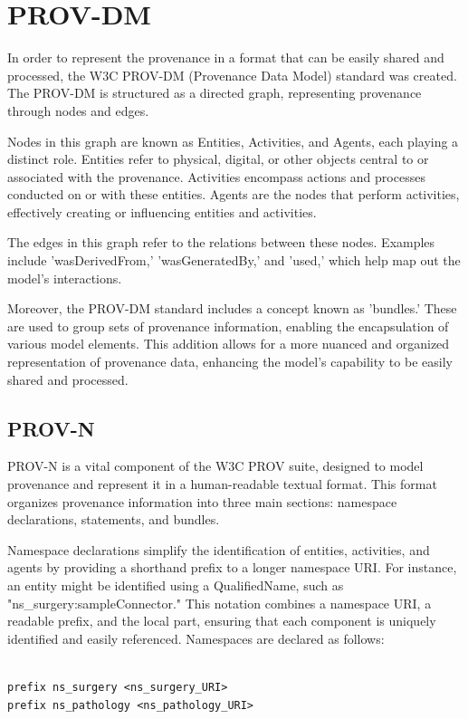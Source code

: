\documentclass[
  digital,     %
  oneside,     %
  nosansbold,  %
  nocolorbold, %
  lof,         %
  lot,         %
]{fithesis4}
\begin{document}
\section{PROV-DM}
\shorthandoff{-}
In order to represent the provenance in a format that can be easily shared and processed, the W3C PROV-DM (Provenance Data Model) standard was created. The PROV-DM is structured as a directed graph, representing provenance through nodes and edges. 

Nodes in this graph are known as Entities, Activities, and Agents, each playing a distinct role. Entities refer to physical, digital, or other objects central to or associated with the provenance. Activities encompass actions and processes conducted on or with these entities. Agents are the nodes that perform activities, effectively creating or influencing entities and activities.

The edges in this graph refer to the relations between these nodes. Examples include 'wasDerivedFrom,' 'wasGeneratedBy,' and 'used,' which help map out the model's interactions.

Moreover, the PROV-DM standard includes a concept known as 'bundles.' These are used to group sets of provenance information, enabling the encapsulation of various model elements. This addition allows for a more nuanced and organized representation of provenance data, enhancing the model's capability to be easily shared and processed.
\shorthandon{-}

\subsection{PROV-N}
\shorthandoff{-}
PROV-N is a vital component of the W3C PROV suite, designed to model provenance and represent it in a human-readable textual format. This format organizes provenance information into three main sections: namespace declarations, statements, and bundles. 

Namespace declarations simplify the identification of entities, activities, and agents by providing a shorthand prefix to a longer namespace URI. For instance, an entity might be identified using a QualifiedName, such as "ns\_surgery:sampleConnector." This notation combines a namespace URI, a readable prefix, and the local part, ensuring that each component is uniquely identified and easily referenced. Namespaces are declared as follows:

\begin{verbatim}

prefix ns_surgery <ns_surgery_URI>
prefix ns_pathology <ns_pathology_URI>

\end{verbatim}
\end{document}

